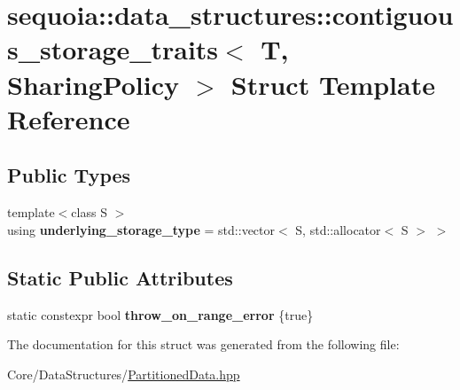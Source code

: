 \hypertarget{structsequoia_1_1data__structures_1_1contiguous__storage__traits}{}\section{sequoia\+::data\+\_\+structures\+::contiguous\+\_\+storage\+\_\+traits$<$ T, Sharing\+Policy $>$ Struct Template Reference}
\label{structsequoia_1_1data__structures_1_1contiguous__storage__traits}
\subsection*{Public Types}
\begin{DoxyCompactItemize}
\item 
\mbox{\label{structsequoia_1_1data__structures_1_1contiguous__storage__traits_a57eb237339fbc7bd5e24fd306ea44f82}} 
{\footnotesize template$<$class S $>$ }\\using {\bfseries underlying\+\_\+storage\+\_\+type} = std\+::vector$<$ S, std\+::allocator$<$ S $>$ $>$
\end{DoxyCompactItemize}
\subsection*{Static Public Attributes}
\begin{DoxyCompactItemize}
\item 
\mbox{\label{structsequoia_1_1data__structures_1_1contiguous__storage__traits_a8eac0059c0d1d536c62b9f43a3bf2b12}} 
static constexpr bool {\bfseries throw\+\_\+on\+\_\+range\+\_\+error} \{true\}
\end{DoxyCompactItemize}


The documentation for this struct was generated from the following file\+:\begin{DoxyCompactItemize}
\item 
Core/\+Data\+Structures/\mbox{\hyperlink{_partitioned_data_8hpp}{Partitioned\+Data.\+hpp}}\end{DoxyCompactItemize}
